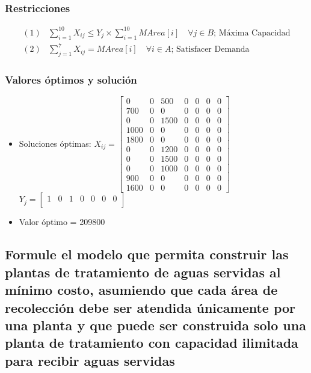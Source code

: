 \documentclass[a4paper,12pt]{article}
\begin{document}
\subsubsection{Restricciones}
\begin{equation*}
\begin{split}
	(1)& \sum_{i=1}^{10}X_{ij}\leq Y_{j}\times \sum_{i=1}^{10}MArea[i]\quad\forall j\in B \text{; Máxima Capacidad}\\
	(2)&\sum_{j=1}^{7}X_{ij}=MArea[i]\quad\forall i\in A \text{; Satisfacer Demanda}
\end{split}
\end{equation*}
\subsubsection{Valores óptimos y solución}
\begin{itemize}
	\item Soluciones óptimas: $X_{ij}=
	\begin{bmatrix}
	0 & 0 & 500 & 0 & 0 & 0 & 0\\
	700 & 0 & 0 & 0 & 0 & 0 & 0\\
	0 & 0 & 1500 & 0 & 0 & 0 & 0\\
	1000 & 0 & 0 & 0 & 0 & 0 & 0\\
	1800 & 0 & 0 & 0 & 0 & 0 & 0\\
	0 & 0 & 1200 & 0 & 0 & 0 & 0\\
	0 & 0 & 1500 & 0 & 0 & 0 & 0\\
	0 & 0 & 1000 & 0 & 0 & 0 & 0\\
	900 & 0 & 0 & 0 & 0 & 0 & 0\\
	1600 & 0 & 0 & 0 & 0 & 0 & 0
	\end{bmatrix}$
	\\
	$Y_{j}=
	\begin{bmatrix}
	1 & 0 & 1 & 0 & 0 & 0 & 0\\
	\end{bmatrix}$
	\item Valor óptimo = 209800
\end{itemize}
\subsection{Formule  el  modelo  que  permita  construir  las  plantas de  tratamiento  de  aguas  servidas  al  mínimo  costo, asumiendo  que  cada  área  de  recolección  debe  ser  atendida  únicamente  por  una  planta  y  que  puede  ser construida solo una planta de tratamiento con capacidad ilimitada para recibir aguas servidas}
\end{document}
